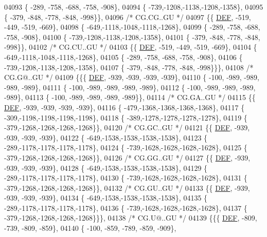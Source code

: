 \begin{DoxyCode}
04093 \{ -289, -758, -688, -758, -908\},
04094 \{ -739,-1208,-1138,-1208,-1358\},
04095 \{ -379, -848, -778, -848, -998\}\},
04096 \textcolor{comment}{/* CG.CG..GU */}
04097 \{\{  \mbox{\hyperlink{1_88_84__epars_8h_a397419fc12b37ed479c8abb9d444d843}{DEF}}, -519, -449, -519, -669\},
04098 \{ -649,-1118,-1048,-1118,-1268\},
04099 \{ -289, -758, -688, -758, -908\},
04100 \{ -739,-1208,-1138,-1208,-1358\},
04101 \{ -379, -848, -778, -848, -998\}\},
04102 \textcolor{comment}{/* CG.CU..GU */}
04103 \{\{  \mbox{\hyperlink{1_88_84__epars_8h_a397419fc12b37ed479c8abb9d444d843}{DEF}}, -519, -449, -519, -669\},
04104 \{ -649,-1118,-1048,-1118,-1268\},
04105 \{ -289, -758, -688, -758, -908\},
04106 \{ -739,-1208,-1138,-1208,-1358\},
04107 \{ -379, -848, -778, -848, -998\}\}\},
04108 \textcolor{comment}{/* CG.G@..GU */}
04109 \{\{\{  \mbox{\hyperlink{1_88_84__epars_8h_a397419fc12b37ed479c8abb9d444d843}{DEF}}, -939, -939, -939, -939\},
04110 \{ -100, -989, -989, -989, -989\},
04111 \{ -100, -989, -989, -989, -989\},
04112 \{ -100, -989, -989, -989, -989\},
04113 \{ -100, -989, -989, -989, -989\}\},
04114 \textcolor{comment}{/* CG.GA..GU */}
04115 \{\{  \mbox{\hyperlink{1_88_84__epars_8h_a397419fc12b37ed479c8abb9d444d843}{DEF}}, -939, -939, -939, -939\},
04116 \{ -479,-1368,-1368,-1368,-1368\},
04117 \{ -309,-1198,-1198,-1198,-1198\},
04118 \{ -389,-1278,-1278,-1278,-1278\},
04119 \{ -379,-1268,-1268,-1268,-1268\}\},
04120 \textcolor{comment}{/* CG.GC..GU */}
04121 \{\{  \mbox{\hyperlink{1_88_84__epars_8h_a397419fc12b37ed479c8abb9d444d843}{DEF}}, -939, -939, -939, -939\},
04122 \{ -649,-1538,-1538,-1538,-1538\},
04123 \{ -289,-1178,-1178,-1178,-1178\},
04124 \{ -739,-1628,-1628,-1628,-1628\},
04125 \{ -379,-1268,-1268,-1268,-1268\}\},
04126 \textcolor{comment}{/* CG.GG..GU */}
04127 \{\{  \mbox{\hyperlink{1_88_84__epars_8h_a397419fc12b37ed479c8abb9d444d843}{DEF}}, -939, -939, -939, -939\},
04128 \{ -649,-1538,-1538,-1538,-1538\},
04129 \{ -289,-1178,-1178,-1178,-1178\},
04130 \{ -739,-1628,-1628,-1628,-1628\},
04131 \{ -379,-1268,-1268,-1268,-1268\}\},
04132 \textcolor{comment}{/* CG.GU..GU */}
04133 \{\{  \mbox{\hyperlink{1_88_84__epars_8h_a397419fc12b37ed479c8abb9d444d843}{DEF}}, -939, -939, -939, -939\},
04134 \{ -649,-1538,-1538,-1538,-1538\},
04135 \{ -289,-1178,-1178,-1178,-1178\},
04136 \{ -739,-1628,-1628,-1628,-1628\},
04137 \{ -379,-1268,-1268,-1268,-1268\}\}\},
04138 \textcolor{comment}{/* CG.U@..GU */}
04139 \{\{\{  \mbox{\hyperlink{1_88_84__epars_8h_a397419fc12b37ed479c8abb9d444d843}{DEF}}, -809, -739, -809, -859\},
04140 \{ -100, -859, -789, -859, -909\},

\end{DoxyCode}

